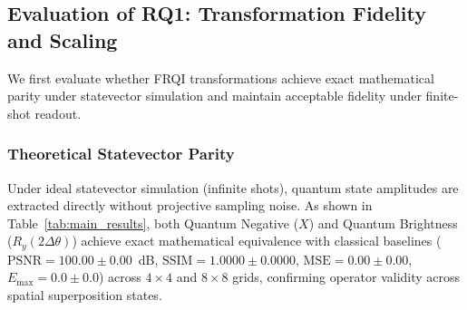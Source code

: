 \documentclass[12pt,onecolumn,draftclsnofoot]{IEEEtran}
\begin{document}
\subsection{Evaluation of RQ1: Transformation Fidelity and Scaling}
We first evaluate whether FRQI transformations achieve exact mathematical parity under statevector simulation and maintain acceptable fidelity under finite-shot readout.

\subsubsection{Theoretical Statevector Parity}
Under ideal statevector simulation (infinite shots), quantum state amplitudes are extracted directly without projective sampling noise. As shown in Table~\ref{tab:main_results}, both Quantum Negative ($X$) and Quantum Brightness ($R_y(2\Delta\theta)$) achieve exact mathematical equivalence with classical baselines ($\text{PSNR} = 100.00 \pm 0.00$~dB, $\text{SSIM} = 1.0000 \pm 0.0000$, $\text{MSE} = 0.00 \pm 0.00$, $E_{\text{max}} = 0.0 \pm 0.0$) across $4\times4$ and $8\times8$ grids, confirming operator validity across spatial superposition states.
\end{document}
